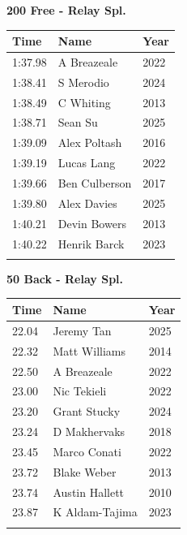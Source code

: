 \vspace{1.2em}
\noindent\begin{minipage}[t]{0.48\textwidth}
\centering
\textbf{\textcolor{teamprimary}{200 Free - Relay Spl.}}\par
\vspace{0.5em}
\centering
\small
\renewcommand{\arraystretch}{1.0}
\setlength{\tabcolsep}{4pt}
\begin{tabular}{@{}p{1.8cm}p{3.0cm}p{1.0cm}@{}}
\toprule
\textbf{Time} & \textbf{Name} & \textbf{Year} \\
\midrule
1:37.98 & A Breazeale & 2022 \\
1:38.41 & S Merodio & 2024 \\
1:38.49 & C Whiting & 2013 \\
1:38.71 & Sean Su & 2025 \\
1:39.09 & Alex Poltash & 2016 \\
1:39.19 & Lucas Lang & 2022 \\
1:39.66 & Ben Culberson & 2017 \\
1:39.80 & Alex Davies & 2025 \\
1:40.21 & Devin Bowers & 2013 \\
1:40.22 & Henrik Barck & 2023 \\
\bottomrule
\vspace{0.5em}
\end{tabular}
\end{minipage}
\hfill
\begin{minipage}[t]{0.48\textwidth}
\centering
\textbf{\textcolor{teamprimary}{50 Back - Relay Spl.}}\par
\vspace{0.5em}
\centering
\small
\renewcommand{\arraystretch}{1.0}
\setlength{\tabcolsep}{4pt}
\begin{tabular}{@{}p{1.8cm}p{3.0cm}p{1.0cm}@{}}
\toprule
\textbf{Time} & \textbf{Name} & \textbf{Year} \\
\midrule
22.04 & Jeremy Tan & 2025 \\
22.32 & Matt Williams & 2014 \\
22.50 & A Breazeale & 2022 \\
23.00 & Nic Tekieli & 2022 \\
23.20 & Grant Stucky & 2024 \\
23.24 & D Makhervaks & 2018 \\
23.45 & Marco Conati & 2022 \\
23.72 & Blake Weber & 2013 \\
23.74 & Austin Hallett & 2010 \\
23.87 & K Aldam-Tajima & 2023 \\
\bottomrule
\vspace{0.5em}
\end{tabular}
\end{minipage}

